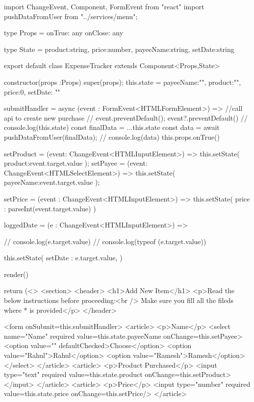 import { ChangeEvent, Component, FormEvent } from "react"
import { pushDataFromUser } from "../services/menu";

type Props = {
    onTrue: any
    onClose: any
}

type State = {
    product:string,
    price:number,
    payeeName:string,
    setDate:string
}

export default class ExpenseTracker extends Component<Props,State>{
   constructor(props :Props){
       super(props);
       this.state = {
           payeeName:"",
           product:"",
           price:0,
           setDate: ""
       }
   }

   submitHandler = async (event : FormEvent<HTMLFormElement>) => {
       //call api to create new purchase
    //    event.preventDefault();
    event?.preventDefault()
        // console.log(this.state)
        const finalData = {
            ...this.state
        }
        const data = await pushDataFromUser(finalData);
        // console.log(data)
        this.props.onTrue()
   }

   setProduct = (event: ChangeEvent<HTMLInputElement>) => {
    this.setState({
        product:event.target.value
    });
   }
   setPayee = (event: ChangeEvent<HTMLSelectElement>) => {
    this.setState({
        payeeName:event.target.value
    });
   }

   setPrice = (event : ChangeEvent<HTMLInputElement>) => {
    this.setState({
        price : parseInt(event.target.value)
    })
}

    loggedDate = (e : ChangeEvent<HTMLInputElement>) => {
    // console.log(e.target.value)
    // console.log(typeof (e.target.value))
    
    this.setState({
        setDate : e.target.value,
    })
    }

   render(){
    return (<>
        <section>
            <header>
                <h1>Add New Item</h1>
                <p>Read the below instructions before proceeding:<br /> Make sure you fill all the fileds where * is provided</p>
            </header>
        
        <form onSubmit={this.submitHandler}>
            <article>
                <p>Name</p>
                <select name="Name" required value={this.state.payeeName} 
                onChange={this.setPayee}>
                    <option value="" defaultChecked>Choose</option>
                    <option value="Rahul">Rahul</option>
                    <option value="Ramesh">Ramesh</option>
                </select>
            </article>
            <article>
                <p>Product Purchased</p>
                <input type="text" required value={this.state.product} onChange={this.setProduct}></input>
            </article>
            <article>
                <p>Price</p>
                <input type="number" required value={this.state.price} onChange={this.setPrice}/>
            </article>

}}
